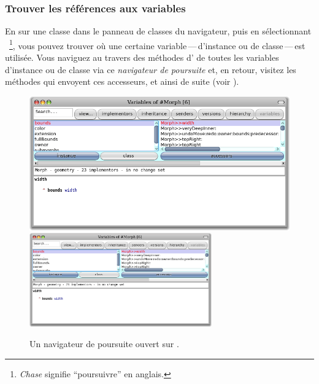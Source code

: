 \documentclass[a4paper,10pt,twoside]{book}
\begin{document}
\subsubsection{Trouver les références aux variables}

En \actclickant sur une classe dans le panneau de classes du
navigateur, puis en sélectionnant
~\footnote{\emph{Chase} signifie
  ``poursuivre'' en anglais.}, vous pouvez trouver 
où une certaine variable\,---\,d'instance ou de classe\,---\,est
utilisée.
Vous naviguez au travers des méthodes d' de toutes les variables
d'instance ou de classe via ce \emph{navigateur de poursuite} et, en
retour, visitez les méthodes qui envoyent ces accesseurs, et
ainsi de suite (voir ).

\begin{figure}[btp]
	\begin{center}
	\ifluluelse
		{\includegraphics[width=\textwidth]{chasingBrowser}}
		{\includegraphics[width=0.7\textwidth]{chasingBrowser}}
	\end{center}
	\caption{Un navigateur de poursuite ouvert sur .}
\end{figure}

\end{document}
